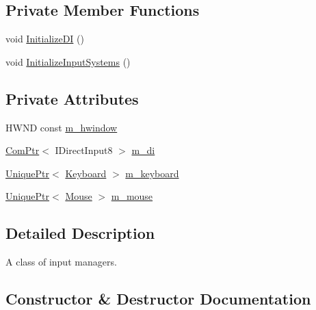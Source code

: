 \subsection*{Private Member Functions}
\begin{DoxyCompactItemize}
\item 
void \hyperlink{classmage_1_1_input_manager_aaee6f1acc558620d2cf6313f3eb36a35}{Initialize\+DI} ()
\item 
void \hyperlink{classmage_1_1_input_manager_a73ec320ef9f3809f092b98da50f99840}{Initialize\+Input\+Systems} ()
\end{DoxyCompactItemize}
\subsection*{Private Attributes}
\begin{DoxyCompactItemize}
\item 
H\+W\+ND const \hyperlink{classmage_1_1_input_manager_add8e8743b27a9c94caa1d793b31b0638}{m\+\_\+hwindow}
\item 
\hyperlink{namespacemage_ae74f374780900893caa5555d1031fd79}{Com\+Ptr}$<$ I\+Direct\+Input8 $>$ \hyperlink{classmage_1_1_input_manager_a0ffbd0e68b5bab33c35f310625884f3a}{m\+\_\+di}
\item 
\hyperlink{namespacemage_a8c307fbcc33bce9b7f2aa4c26c3b95cf}{Unique\+Ptr}$<$ \hyperlink{classmage_1_1_keyboard}{Keyboard} $>$ \hyperlink{classmage_1_1_input_manager_a196bdd04e169e89d0fa5f6a4a180e4cb}{m\+\_\+keyboard}
\item 
\hyperlink{namespacemage_a8c307fbcc33bce9b7f2aa4c26c3b95cf}{Unique\+Ptr}$<$ \hyperlink{classmage_1_1_mouse}{Mouse} $>$ \hyperlink{classmage_1_1_input_manager_aab9773cccf9626a7e2acb99227b42e37}{m\+\_\+mouse}
\end{DoxyCompactItemize}


\subsection{Detailed Description}
A class of input managers. 

\subsection{Constructor \& Destructor Documentation}
\hypertarget{classmage_1_1_input_manager_afc28df27a0251c242113a9761c007534}{}\label{classmage_1_1_input_manager_afc28df27a0251c242113a9761c007534} 
